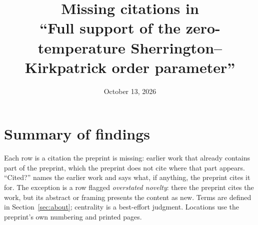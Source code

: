 \documentclass[11pt]{article}
\title{Missing citations in\\ ``Full support of the zero-temperature
Sherrington--Kirkpatrick order parameter''}
\date{October 13, 2026}
\newcounter{finding}
\begin{document}
\maketitle

\section*{Summary of findings}

Each row is a citation the preprint is missing: earlier work that already
contains part of the preprint, which the preprint does not cite where that
part appears. ``Cited?'' names the earlier work and says what, if anything, the
preprint cites it for. The exception is a row flagged \emph{overstated
novelty}: there the preprint cites the work, but its abstract or framing
presents the content as new. Terms are defined in Section~\ref{sec:about};
centrality is a best-effort judgment. Locations use the preprint's own
numbering and printed pages.
\end{document}
